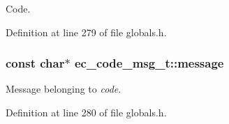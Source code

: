 Code. 



Definition at line 279 of file globals.\-h.

\subsubsection[{message}]{\setlength{\rightskip}{0pt plus 5cm}const char$\ast$ ec\-\_\-code\-\_\-msg\-\_\-t\-::message}\label{structec__code__msg__t_a9b1fef025e25828a20170a275c5976e3}


Message belonging to {\itshape code}. 



Definition at line 280 of file globals.\-h.

